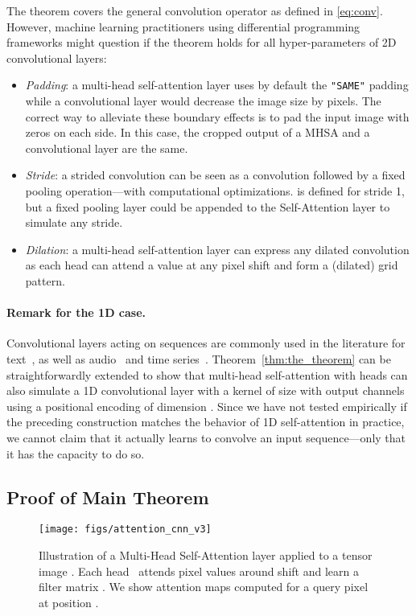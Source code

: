 \documentclass{article} \usepackage{iclr2020_conference,times}
\begin{document}
The theorem covers the general convolution operator as defined in \cref{eq:conv}.
However, machine learning practitioners using differential programming frameworks \citep{paszke2017automatic,tensorflow2015-whitepaper} might question if the theorem holds for all hyper-parameters of 2D convolutional layers:
\begin{itemize}
  \item \emph{Padding}: a multi-head self-attention layer uses by default the \texttt{"SAME"} padding while a convolutional layer would decrease the image size by  pixels. The correct way to alleviate these boundary effects is to pad the input image with  zeros on each side. In this case, the cropped output of a MHSA and a convolutional layer are the same.
  \item \emph{Stride}: a strided convolution can be seen as a convolution followed by a fixed pooling operation---with computational optimizations.  is defined for stride 1, but a fixed pooling layer could be appended to  the Self-Attention layer to simulate any stride.
  \item \emph{Dilation}: a multi-head self-attention layer can express any dilated convolution as each head can attend a value at any pixel shift and form a (dilated) grid pattern.
\end{itemize}


\paragraph{Remark for the 1D case.} Convolutional layers acting on sequences are commonly used in the literature for text~\citep{kim-2014-convolutional}, as well as audio~\citep{oord2016wavenet} and time series~\citep{franceschi2019unsupervised}.
Theorem~\ref{thm:the_theorem} can be straightforwardly extended to show that multi-head self-attention with  heads can also simulate a 1D convolutional layer with a kernel of size  with  output channels using a positional encoding of dimension . Since we have not tested empirically if the preceding construction matches the behavior of 1D self-attention in practice, we cannot claim that it actually learns to convolve an input sequence---only that it has the capacity to do so.


\subsection*{Proof of Main Theorem}

\begin{figure}[t]
\centering
\vspace{-2mm}
  \texttt{[image: figs/attention\_cnn\_v3]}
  \caption{Illustration of a Multi-Head Self-Attention layer applied to a tensor image .
  Each head~ attends pixel values around shift  and learn a filter matrix .
  We show attention maps computed for a query pixel at position .\vspace{-3mm}}
  \label{fig:attention}
\end{figure}
\end{document}
